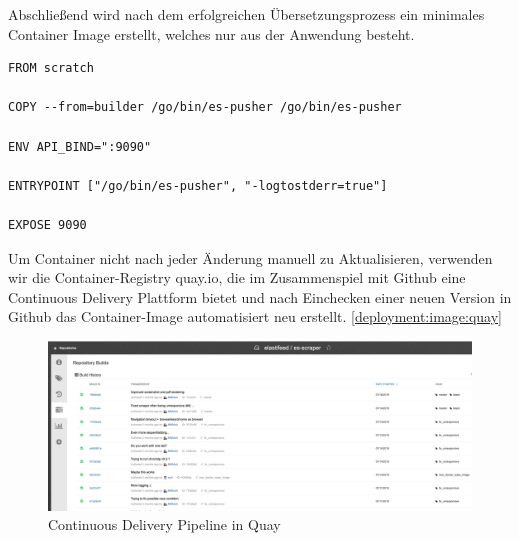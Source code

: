 Abschließend wird nach dem erfolgreichen Übersetzungsprozess ein minimales Container Image erstellt, welches nur aus der Anwendung besteht.

\begin{verbatim}
FROM scratch

COPY --from=builder /go/bin/es-pusher /go/bin/es-pusher

ENV API_BIND=":9090"

ENTRYPOINT ["/go/bin/es-pusher", "-logtostderr=true"]

EXPOSE 9090
\end{verbatim}

Um Container nicht nach jeder Änderung manuell zu Aktualisieren, verwenden wir die Container-Registry quay.io, die im Zusammenspiel mit Github eine Continuous Delivery Plattform bietet und nach Einchecken einer neuen Version in Github das Container-Image automatisiert neu erstellt. \autoref{deployment:image:quay}

\begin{figure}[t]
  \centering
  \includegraphics[width=\linewidth]{images/quay.png}
  \caption{Continuous Delivery Pipeline in Quay}
  \label{deployment:image:quay}
\end{figure}

